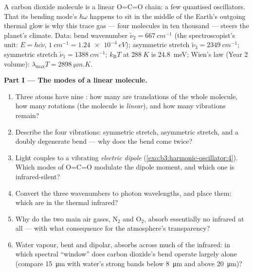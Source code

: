 \begin{problem}\label{pb:b3:harmonic-oscillator:1}
A carbon dioxide molecule is a linear O=C=O chain: a few quantised
oscillators. That its bending mode's $\hbar\omega$ happens to sit in
the middle of the Earth's outgoing thermal glow is why this trace
gas --- four molecules in ten thousand --- steers the planet's
climate. Data: bend wavenumber $\tilde\nu_2 = \qty{667}{cm^{-1}}$
(the spectroscopist's unit: $E = hc\tilde\nu$, $\qty{1}{cm^{-1}} =
\qty{1.24e-4}{eV}$); asymmetric stretch $\tilde\nu_3 =
\qty{2349}{cm^{-1}}$; symmetric stretch $\tilde\nu_1 =
\qty{1388}{cm^{-1}}$; $k_{\text{B}}T$ at $\qty{288}{K}$ is
\qty{24.8}{meV}; Wien's law (Year 2 volume): $\lambda_{\max}T =
\qty{2898}{\micro m.K}$.

\medskip\noindent\textbf{Part I --- The modes of a linear molecule.}
\begin{enumerate}
  \item Three atoms have nine : how many are
        translations of the whole molecule, how many rotations (the
        molecule is \emph{linear}), and how many vibrations remain?
  \item Describe the four vibrations: symmetric stretch, asymmetric
        stretch, and a doubly degenerate bend --- why does the bend
        come twice?
  \item Light couples to a vibrating \emph{electric dipole}
        (\cref{exo:b3:harmonic-oscillator:4}). Which modes of
        O=C=O modulate the dipole moment, and which one is
        infrared-silent?
  \item Convert the three wavenumbers to photon wavelengths, and
        place them: which are in the thermal infrared?
  \item Why do the two main air gases, N$_2$ and O$_2$, absorb
        essentially no infrared at all --- with what consequence for
        the atmosphere's transparency?
  \item Water vapour, bent and dipolar, absorbs across much of the
        infrared: in which spectral ``window'' does carbon dioxide's
        bend operate largely alone (compare \qty{15}{\micro m} with
        water's strong bands below \qty{8}{\micro m} and above
        \qty{20}{\micro m})?
\end{enumerate}


\end{problem}
